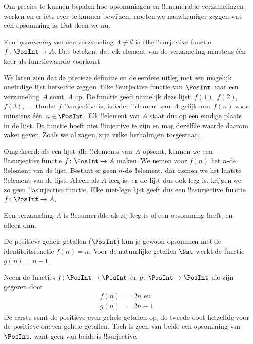 \documentclass[../../../include/open-logic-section]{subfiles}
\begin{document}
Om precies te kunnen bepalen hoe opsommingen en !!{enumerable}
verzamelingen werken en er iets over te kunnen bewijzen, moeten we
nauwkeuriger zeggen wat een opsomming is. Dat doen we nu.

\begin{defn} 
Een \emph{opsomming} van een verzameling $A \neq \emptyset$ is elke
!!{surjective} functie $f \colon \PosInt \to A$. Dat betekent dat elk
element van de verzameling minstens één keer als functiewaarde voorkomt.
\end{defn}

\begin{explain}
We laten zien dat de precieze definitie en de eerdere uitleg met een
mogelijk oneindige lijst hetzelfde zeggen. Elke !!{surjective} functie
van $\PosInt$ naar een verzameling~$A$ somt~$A$ op. De functie geeft
namelijk deze lijst: $f(1)$, $f(2)$, $f(3)$, \dots. Omdat $f$
!!{surjective} is, is ieder !!{element} van~$A$ gelijk aan~$f(n)$ voor
minstens één~$n \in \PosInt$. Elk !!{element} van $A$ staat dus op een
eindige plaats in de lijst. De functie hoeft niet !!{injective} te
zijn en mag dezelfde waarde daarom vaker geven. Zoals we al zagen, zijn
zulke herhalingen toegestaan.

Omgekeerd: als een lijst alle !!{element}s van~$A$ opsomt, kunnen we een
!!a{surjective} functie $f\colon \PosInt \to A$ maken. We nemen voor
$f(n)$ het $n$-de !!{element} van de lijst. Bestaat er geen $n$-de
!!{element}, dan nemen we het laatste !!{element} van de lijst. Alleen
als $A$ leeg is, en de lijst dus ook leeg is, krijgen we zo geen
!!a{surjective} functie. Elke niet-lege lijst geeft dus een
!!a{surjective} functie $f\colon \PosInt \to A$.
\end{explain}

\begin{defn}
  Een verzameling~$A$ is !!{enumerable} als zij leeg is of een opsomming
  heeft, en alleen dan.
\end{defn}

\begin{ex}
De positieve gehele getallen ($\PosInt$) kun je gewoon opsommen met de
identiteitsfunctie $f(n) = n$. Voor de natuurlijke getallen $\Nat$
werkt de functie $g(n) = n - 1$.
\end{ex}

\begin{ex}
Neem de functies $f\colon \PosInt \to \PosInt$ en $g \colon \PosInt \to
\PosInt$ die zijn gegeven door
\begin{align*}
f(n) & = 2n \text{ en}\\
g(n) & = 2n - 1
\end{align*}
De eerste somt de positieve even gehele getallen op; de tweede doet
hetzelfde voor de positieve oneven gehele getallen. Toch is geen van
beide een opsomming van $\PosInt$, want geen van beide is
!!{surjective}.
\end{ex}
\end{document}
